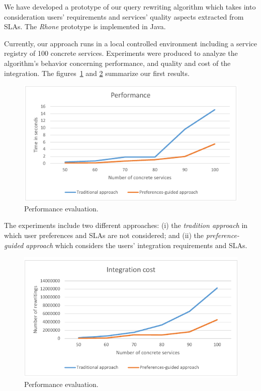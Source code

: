 We have developed a prototype of our query rewriting algorithm which takes into consideration users' requirements and services' quality aspects extracted from SLAs. The \textit{Rhone} prototype is implemented in Java.

Currently, our approach runs in a local controlled environment including a service registry of 100 concrete services. 
Experiments were produced to analyze the algorithm's behavior concerning performance, and quality and cost of the integration. The figures~\ref{fig01} and \ref{fig02} summarize our first results.

\begin{figure}[!h]
\centering
\includegraphics[scale=0.8]{fig1.pdf}
\caption{Performance evaluation.}\label{fig01}
\end{figure} 

The experiments include two different approaches: (i) the \textit{tradition approach} in which user preferences and SLAs are not considered; and (ii) the \textit{preference-guided approach} which considers the users' integration requirements and SLAs.

\begin{figure}[!h]
\centering
\includegraphics[scale=0.8]{fig2.pdf}
\caption{Performance evaluation.}\label{fig02}
\end{figure} 

